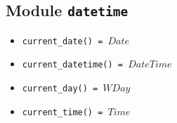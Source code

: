 \documentclass[10pt]{article}
\newcommand{\ignore}[1]{}
\begin{document}
\begin{multicols}{2}
\section*{Module \texttt{datetime}}  
\begin{scriptsize}
\begin{itemize}
\item \texttt{current\_date() = $Date$}
\item \texttt{current\_datetime() = $DateTime$}
\item \texttt{current\_day() = $WDay$}
\item \texttt{current\_time() = $Time$}
\end{itemize}
\end{scriptsize}
\ignore{
\section*{Module \texttt{thread}}
\begin{scriptsize}
\begin{itemize}
    \item \texttt{acquire\_mutex($Mutex$)}
    \item \texttt{broadcast\_cv($CV$)}
    \item \texttt{join($Thread$)}
    \item \texttt{new\_cv() = $CV$}
    \item \texttt{new\_mutex() = $Mutex$}
    \item \texttt{new\_rwlock() = $RWLock$}
    \item \texttt{new\_semaphore() = $Semaphore$}
    \item \texttt{new\_semaphore($N$) = $Semaphore$}
    \item \texttt{new\_thread($S$, $Arg_1$, $\ldots$, $Arg_n$) = $Thread$}
    \item \texttt{p\_semaphore($Semaphore$)}
    \item \texttt{rdlock($RWLock$)}
    \item \texttt{release\_mutex($Mutex$)}
    \item \texttt{rwunlock($RWLock$)}
    \item \texttt{signal\_cv($CV$)}
    \item \texttt{sleep($Milliseconds$)}
    \item \texttt{start($Thread$)}
    \item \texttt{this\_thread() = $Thread$}
    \item \texttt{v\_semaphore($Semaphore$)}
    \item \texttt{wait\_cv($CV$, $Mutex$)}
    \item \texttt{wrlock($RWLock$)}
\end{itemize}
\end{scriptsize}
}
\end{multicols}
\end{document}
